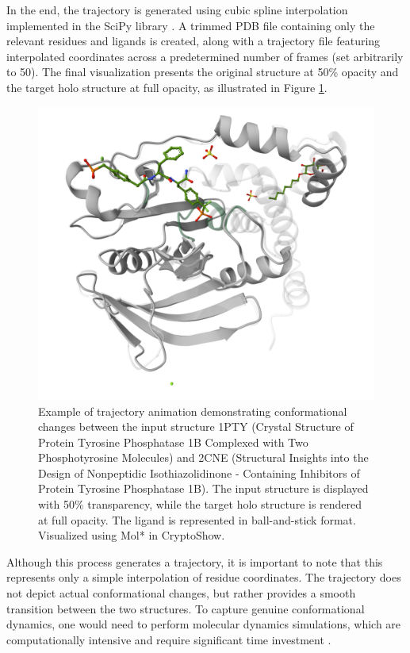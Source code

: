 In the end, the trajectory is generated using cubic spline interpolation \cite{mckinley1998cubic} implemented in the SciPy library \cite{virtanen2020scipy}. A trimmed PDB file containing only the relevant residues and ligands is created, along with a trajectory file  featuring interpolated coordinates across a predetermined number of frames (set arbitrarily to 50). The final visualization presents the original structure at 50\% opacity and the target holo structure at full opacity, as illustrated in Figure \ref{fig:trajectory-animation}.

\begin{figure}[htbp]
    \centering
    \includegraphics[width=\textwidth]{img/trajectory_animation.png}
    \caption{Example of trajectory animation demonstrating conformational changes between the input structure 1PTY (Crystal Structure of Protein Tyrosine Phosphatase 1B Complexed with Two Phosphotyrosine Molecules) and 2CNE (Structural Insights into the Design of Nonpeptidic Isothiazolidinone - Containing Inhibitors of Protein Tyrosine Phosphatase 1B). The input structure is displayed with 50\% transparency, while the target holo structure is rendered at full opacity. The ligand is represented in ball-and-stick format. Visualized using Mol* in CryptoShow.}
    \label{fig:trajectory-animation}
\end{figure}

Although this process generates a trajectory, it is important to note that this represents only a simple interpolation of residue coordinates. The trajectory does not depict actual conformational changes, but rather provides a smooth transition between the two structures. To capture genuine conformational dynamics, one would need to perform molecular dynamics simulations, which are computationally intensive and require significant time investment \cite{schlitter1993targeted}.

